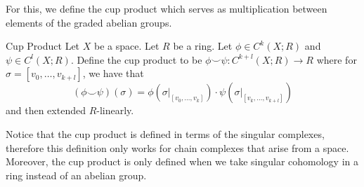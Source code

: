\documentclass[a4paper]{article}
\begin{document}
For this, we define the cup product which serves as multiplication between elements of the graded abelian groups. 

\begin{defn}{Cup Product}{} Let $X$ be a space. Let $R$ be a ring. Let $\phi\in C^k(X;R)$ and $\psi\in C^l(X;R)$. Define the cup product to be $\phi\smile\psi:C^{k+l}(X;R)\to R$ where for $\sigma=[v_0,\dots,v_{k+l}]$, we have that $$(\phi\smile\psi)(\sigma)=\phi(\sigma|_{[v_0,\dots,v_k]})\cdot\psi(\sigma|_{[v_k,\dots,v_{k+l}]})$$ and then extended $R$-linearly. 
\end{defn}

Notice that the cup product is defined in terms of the singular complexes, therefore this definition only works for chain complexes that arise from a space. Moreover, the cup product is only defined when we take singular cohomology in a ring instead of an abelian group. 
\end{document}
